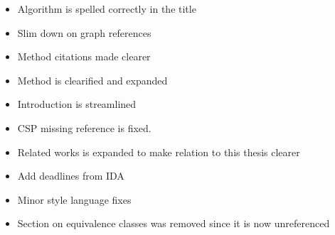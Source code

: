 \documentclass[msc,lith,english]{liuthesis}
\begin{document}
\begin{itemize}
  \item Algorithm is spelled correctly in the title
  \item Slim down on graph references
  \item Method citations made clearer
  \item Method is clearified and expanded
  \item Introduction is streamlined
  \item CSP missing reference is fixed. 
  \item Related works is expanded to make relation to this thesis clearer
  \item Add deadlines from IDA
  \item Minor style language fixes
  \item Section on equivalence classes was removed since it is now unreferenced
\end{itemize}
\end{document}
